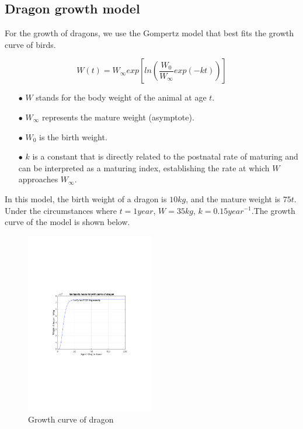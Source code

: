 \documentclass[12pt]{article}  %
\newenvironment{shrinkeq}[1]
{ \bgroup
	\addtolength\abovedisplayshortskip{#1}
	\addtolength\abovedisplayskip{#1}
	\addtolength\belowdisplayshortskip{#1}
	\addtolength\belowdisplayskip{#1}}
{\egroup\ignorespacesafterend}
\begin{document}
\subsection{Dragon growth model}
For the growth of dragons, we use the Gompertz model that best fits the growth curve of birds.

\begin{shrinkeq}{-1ex}
	\begin{equation}
    \label{eq:eq1}
	   W(t) = W_{\infty}exp[ln(\frac{W_0}{W_{\infty}}exp(-kt))]
	\end{equation}
\end{shrinkeq}

\begin{itemize}
\vspace{-0.2cm}
\item[$\bullet$] \textbf{$W$ }stands for the body weight of the animal at age $t$. 
\vspace{-0.2cm}
\item[$\bullet$] \textbf{$W_{\infty}$ }represents the mature weight (asymptote).
\vspace{-0.2cm}
\item[$\bullet$] \textbf{$W_{0}$ }is the birth weight.
\vspace{-0.2cm}
\item[$\bullet$] \textbf{$k$ }is a constant that is directly related to the postnatal rate of maturing and can be interpreted as a maturing index, establishing the rate at which $W$ approaches $W_{\infty}$.
\end{itemize}
\vspace{-0.3cm}
In this model, the birth weight of a dragon is $10kg$, and the mature weight is $75t$. Under the circumstances where $t = 1 year$, $W = 35kg$, $k =0.15 year^{-1}$.The growth curve of the model is shown below.
\begin{figure}[h]
	\centering
	\includegraphics[width=0.5\textwidth]{easymcm/img/Gompertz model Growth curve of dragon.pdf}
	\caption{Growth curve of dragon}
\end{figure}
	
\end{document}
